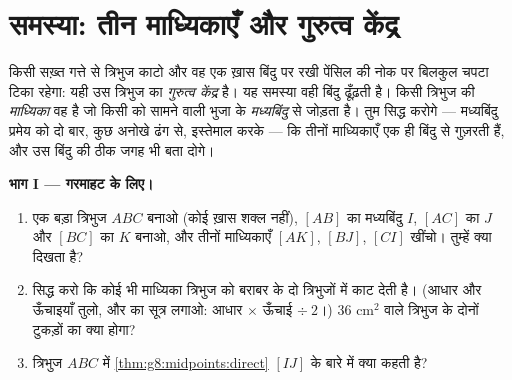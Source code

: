 \section{समस्या: तीन माध्यिकाएँ और गुरुत्व केंद्र}

\begin{problem}[{सप्ताहांत समस्या --- किसी त्रिभुज की माध्यिकाएँ एक
ही बिंदु पर मिलती हैं, हर एक के दो-तिहाई पर}]
\label{pb:g8:midpoints:1}
किसी सख़्त गत्ते से त्रिभुज काटो और वह एक ख़ास बिंदु पर रखी पेंसिल की
नोक पर बिलकुल चपटा टिका रहेगा: यही उस त्रिभुज का \emph{गुरुत्व
केंद्र} है। यह समस्या वही बिंदु ढूँढ़ती है।
किसी त्रिभुज की \emph{माध्यिका} वह  है जो
किसी  को सामने वाली भुजा के \emph{मध्यबिंदु} से जोड़ता है। तुम
सिद्ध करोगे --- मध्यबिंदु प्रमेय को दो बार, कुछ अनोखे ढंग से,
इस्तेमाल करके --- कि तीनों माध्यिकाएँ एक ही बिंदु से गुज़रती हैं, और
उस बिंदु की ठीक जगह भी बता दोगे।

\medskip
\noindent\textbf{भाग I --- गरमाहट के लिए।}
\begin{enumerate}
  \item एक बड़ा त्रिभुज $ABC$ बनाओ (कोई ख़ास शक्ल नहीं), $[AB]$ का
        मध्यबिंदु $I$, $[AC]$ का $J$ और $[BC]$ का $K$ बनाओ, और
        तीनों माध्यिकाएँ $[AK]$, $[BJ]$, $[CI]$ खींचो। तुम्हें
        क्या दिखता है?
  \item सिद्ध करो कि कोई भी माध्यिका त्रिभुज को बराबर  के
        दो त्रिभुजों में काट देती है। (आधार और ऊँचाइयाँ तुलो, और
         का सूत्र लगाओ: आधार $\times$ ऊँचाई $\div\ 2$।)
        $36$ cm$^2$  वाले त्रिभुज के दोनों टुकड़ों का
         क्या होगा?
  \item त्रिभुज $ABC$ में \cref{thm:g8:midpoints:direct} 
        $[IJ]$ के बारे में क्या कहती है?
\end{enumerate}


\end{problem}
